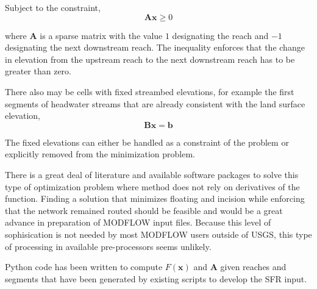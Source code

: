 \documentclass[12pt,letterpaper]{article}
\begin{document}
\noindent Subject to the constraint,
\begin{equation}
	{\mathbf A}{\mathbf x} \geq 0  \label{eq:constraint}
\end{equation}

\noindent where ${\mathbf A}$ is a sparse matrix with the value $1$ designating the reach and
$-1$ designating the next downstream reach.  The inequality 
enforces that the change in elevation from the upstream reach to the next downstream reach has to be
greater than zero.

There also may be cells with fixed streambed elevations, for example the first segments of headwater streams
that are already consistent with the land surface elevation, 
\begin{equation}
	{\mathbf B} {\mathbf x} = {\mathbf b}  \label{eq:fixed}
\end{equation}

\noindent The fixed elevations can either be handled as a constraint of the problem or explicitly removed from the minimization problem.

There is a great deal of literature and available software packages to solve this type of optimization
problem where method does not rely on derivatives of the function.  Finding a solution that 
minimizes floating and incision while enforcing that the network remained routed should be feasible and
would be a great advance in preparation of MODFLOW input files.  Because this level of sophisication is
not needed by most MODFLOW users outside of USGS, this type of processing in available pre-processors
seems unlikely.

Python code has been written to compute $F({\mathbf x})$ and ${\mathbf A}$ given reaches and segments that have been generated by existing scripts to develop the SFR input.

\newpage
{}

\end{document}

